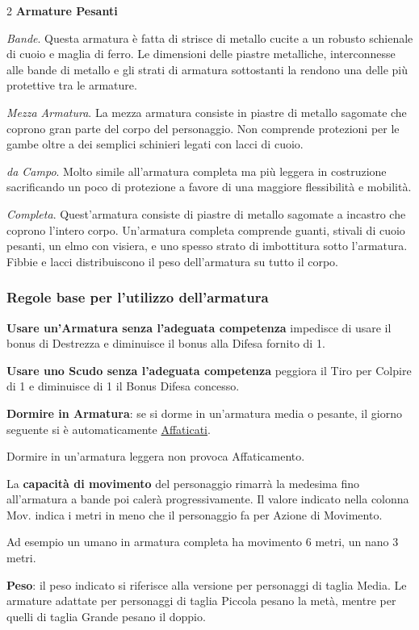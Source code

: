\begin{multicols}{2}
\textbf{Armature Pesanti}

\emph{Bande}. Questa armatura è fatta di strisce di metallo cucite a un robusto schienale di cuoio e maglia di ferro. Le dimensioni delle piastre metalliche, interconnesse alle bande di metallo e gli strati di armatura sottostanti la rendono una delle più protettive tra le armature.

\emph{Mezza Armatura}. La mezza armatura consiste in piastre di metallo sagomate che coprono gran parte del corpo del personaggio. Non comprende protezioni per le gambe oltre a dei semplici schinieri legati con lacci di cuoio.

\emph{da Campo}. Molto simile all'armatura completa ma più leggera in costruzione sacrificando un poco di protezione a favore di una maggiore flessibilità e mobilità.

\emph{Completa}. Quest'armatura consiste di piastre di metallo sagomate a incastro che coprono l'intero corpo. Un'armatura completa comprende guanti, stivali di cuoio pesanti, un elmo con visiera, e uno spesso strato di imbottitura sotto l'armatura. Fibbie e lacci distribuiscono il peso dell'armatura su tutto il corpo.


\subsubsection{Regole base per l'utilizzo dell'armatura}

\textbf{Usare un'Armatura senza l'adeguata competenza} impedisce di usare il bonus di Destrezza e diminuisce il bonus alla Difesa fornito di 1.

\textbf{Usare uno Scudo senza l'adeguata competenza} peggiora il Tiro per Colpire di 1 e diminuisce di 1 il Bonus Difesa concesso.

\textbf{Dormire in Armatura}: se si dorme in un'armatura media o pesante, il giorno seguente si è automaticamente \hyperlink{affaticato}{Affaticati}.

Dormire in un'armatura leggera non provoca Affaticamento.

La \textbf{capacità di movimento} del personaggio rimarrà la medesima fino all'armatura a bande poi calerà progressivamente. Il valore indicato nella colonna Mov. indica i metri in meno che il personaggio fa per Azione di Movimento.

Ad esempio un umano in armatura completa ha movimento 6 metri, un nano 3 metri.

\textbf{Peso}: il peso indicato si riferisce alla versione per personaggi di taglia Media. Le armature adattate per personaggi di taglia Piccola pesano la metà, mentre per quelli di taglia Grande pesano il doppio.


\end{multicols}
